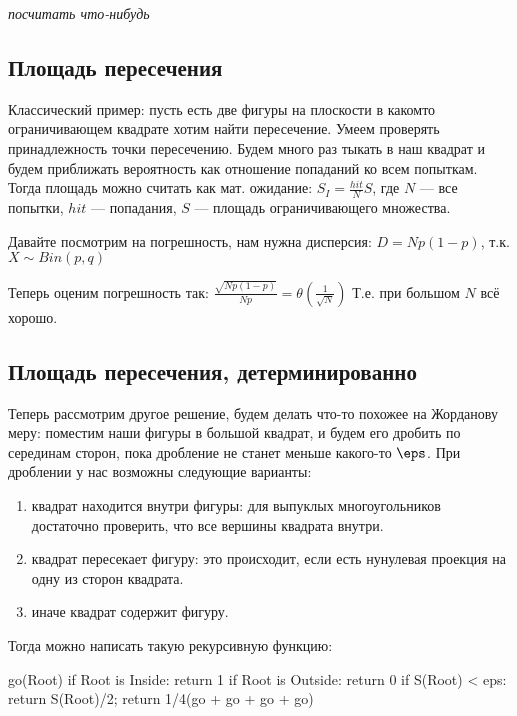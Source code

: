 \textit{посчитать что-нибудь}

\subsection{Площадь пересечения}

Классический пример: пусть есть две фигуры на плоскости в какомто ограничивающем квадрате
хотим найти пересечение. Умеем проверять принадлежность точки пересечению.
Будем много раз тыкать в наш квадрат и будем приближать вероятность как отношение
попаданий ко всем попыткам. Тогда площадь можно считать как мат. ожидание:
$S_I = \frac{hit}{N} S$, где $N$ --- все попытки, $hit$ --- попадания, $S$ --- площадь 
ограничивающего множества.

Давайте посмотрим на погрешность, нам нужна дисперсия: $D = Np(1-p)$, т.к. $X\sim Bin(p, q)$

Теперь оценим погрешность так: $\frac{\sqrt{Np(1-p)}}{Np} = \theta(\frac{1}{\sqrt{N}})$
Т.е. при большом $N$ всё хорошо.

\subsection{Площадь пересечения, детерминированно}

Теперь рассмотрим другое решение, будем делать что-то похожее на Жорданову меру:
поместим наши фигуры в большой квадрат, и будем его дробить по серединам сторон,
пока дробление не станет меньше какого-то $\eps$. При дроблении у нас возможны следующие варианты:

\begin{enumerate}
    \item квадрат находится внутри фигуры: для выпуклых многоугольников
        достаточно проверить, что все вершины квадрата внутри.
    \item квадрат пересекает фигуру: это происходит, если есть нунулевая проекция
        на одну из сторон квадрата.
    \item иначе квадрат содержит фигуру.
\end{enumerate}

Тогда можно написать такую рекурсивную функцию:

\begin{cppcode}
    go(Root)
    if Root is Inside:
        return 1
    if Root is Outside:
        return 0
    if S(Root) < eps:
        return S(Root)/2;
    return 1/4(go + go + go + go)
\end{cppcode}

